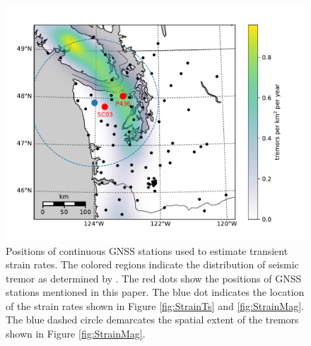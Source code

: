 \documentclass[10pt,letter]{article}
\begin{document}
\begin{figure}
\includegraphics{figures/context_map/context-map.pdf}
\caption{Positions of continuous GNSS stations used to estimate transient strain rates. The colored regions indicate the distribution of seismic tremor as determined by \citet{Wech2010}. The red dots show the positions of GNSS stations mentioned in this paper. The blue dot indicates the location of the strain rates shown in Figure \ref{fig:StrainTs} and \ref{fig:StrainMag}. The blue dashed circle demarcates the spatial extent of the tremors shown in Figure \ref{fig:StrainMag}.}    
\label{fig:Context}
\end{figure}
\end{document}
